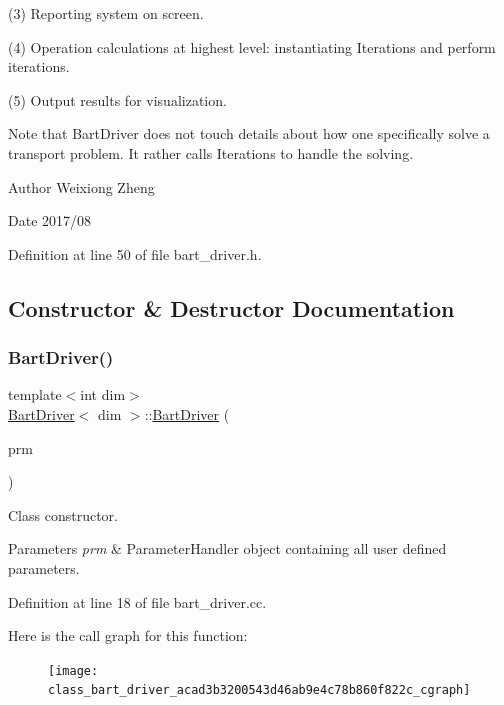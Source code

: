 (3) Reporting system on screen.

(4) Operation calculations at highest level\+: instantiating Iterations and perform iterations.

(5) Output results for visualization.

Note that Bart\+Driver does not touch details about how one specifically solve a transport problem. It rather calls Iterations to handle the solving.

\begin{DoxyAuthor}{Author}
Weixiong Zheng 
\end{DoxyAuthor}
\begin{DoxyDate}{Date}
2017/08 
\end{DoxyDate}


Definition at line 50 of file bart\+\_\+driver.\+h.



\subsection{Constructor \& Destructor Documentation}
\mbox{\label{class_bart_driver_acad3b3200543d46ab9e4c78b860f822c}} 
\subsubsection{\texorpdfstring{Bart\+Driver()}{BartDriver()}}
{\footnotesize\ttfamily template$<$int dim$>$ \\
\hyperlink{class_bart_driver}{Bart\+Driver}$<$ dim $>$\+::\hyperlink{class_bart_driver}{Bart\+Driver} (\begin{DoxyParamCaption}\item[{Parameter\+Handler \&}]{prm }\end{DoxyParamCaption})}

Class constructor.


\begin{DoxyParams}{Parameters}
{\em prm} & Parameter\+Handler object containing all user defined parameters. \\
\hline
\end{DoxyParams}


Definition at line 18 of file bart\+\_\+driver.\+cc.

Here is the call graph for this function\+:\nopagebreak
\begin{figure}[H]
\begin{center}
\leavevmode
\texttt{[image: class\_bart\_driver\_acad3b3200543d46ab9e4c78b860f822c\_cgraph]}
\end{center}
\end{figure}
\mbox{\label{class_bart_driver_aa89fe626d99cb4013b83d5e99698a9f3}} 

